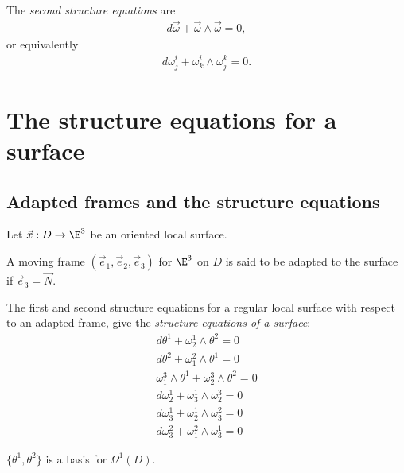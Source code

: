 \documentclass{article}
\begin{document}
\begin{theorem}
    The \emph{second structure equations} are 
    \begin{align*}
        d\vec\omega + \vec \omega \wedge\vec \omega = 0,
    \end{align*}
    or equivalently 
    \begin{align*}
        d\omega_j^i + \omega_k^i\wedge\omega_j^k=0.
    \end{align*}
\end{theorem}

\section{The structure equations for a surface}

\subsection{Adapted frames and the structure equations}

Let $\vec x: D \to \E^3$ be an oriented local surface.

\begin{definition}[Notes 11.1]
    A moving frame $(\vec e_1, \vec e_2, \vec e_3)$ for $\E^3$ on $D$
    is said to be adapted to the surface if $\vec e_3 = \vec N$.
\end{definition}

\begin{proposition}[Notes 11.2]
    The first and second structure equations for a regular local surface 
    with respect to an adapted frame, give the \emph{structure equations
    of a surface}:
    \begin{align*}
        d\theta^1 + \omega_2^1\wedge\theta^2 = 0\\
        d\theta^2 + \omega_1^2\wedge\theta^1 = 0\\
        \omega_1^3\wedge\theta^1 + \omega_2^3\wedge\theta^2 = 0\\
        d\omega_2^1+\omega_3^1\wedge\omega_2^3 = 0\\
        d\omega_3^1 + \omega_2^1 \wedge \omega_3^2 = 0\\
        d\omega_3^2 + \omega_1^2 \wedge \omega_3^1 = 0
    \end{align*}
\end{proposition}

\begin{lemma}[Notes 11.3]
    $\{\theta^1, \theta^2\}$ is a basis for $\Omega^1(D)$. 
\end{lemma}
\end{document}
